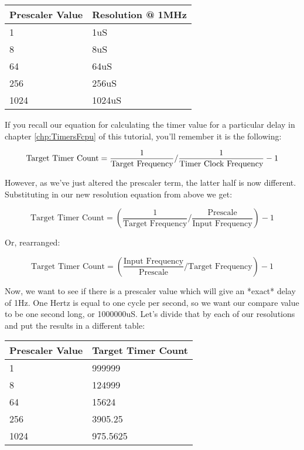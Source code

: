 \documentclass[a4paper,oneside,notitlepage]{book}
\begin{document}
\begin{center}
\begin{tabular}{|l|l|}
	\hline
	Prescaler Value & Resolution @ 1MHz \\
	\hline
	1               & 1uS    \\
	8               & 8uS    \\
	64              & 64uS   \\
	256             & 256uS  \\
	1024            & 1024uS \\
	\hline
\end{tabular}
\end{center}

If you recall our equation for calculating the timer value for a particular delay in chapter \ref{chp:TimersFcpu} of this tutorial, you'll remember it is the following: 

\begin{displaymath}
\text{Target Timer Count} = \frac{1}{\text{Target Frequency}} / \frac{1}{\text{Timer Clock Frequency}} - 1 \\
\end{displaymath}

However, as we've just altered the prescaler term, the latter half is now different. Substituting in our new resolution equation from above we get: 

\begin{displaymath}
\text{Target Timer Count} = (\frac{1}{\text{Target Frequency}} / \frac{\text{Prescale}}{\text{Input Frequency}}) - 1 
\end{displaymath}

Or, rearranged:

\begin{displaymath}
\text{Target Timer Count} = (\frac{\text{Input Frequency}}{\text{Prescale}} / \text{Target Frequency}) - 1  
\end{displaymath}

Now, we want to see if there is a prescaler value which will give an *exact* delay of 1Hz. One Hertz is equal to one cycle per second, so we want our compare value to be one second long, or 1000000uS. Let's divide that by each of our resolutions and put the results in a different table: 

\begin{center}
\begin{tabular}{|l|l|}
	\hline
	Prescaler Value & Target Timer Count \\
	\hline
	1    & 999999   \\
	8    & 124999   \\
	64   & 15624    \\
	256  & 3905.25  \\
	1024 & 975.5625 \\
	\hline
\end{tabular}
\end{center}
\end{document}
